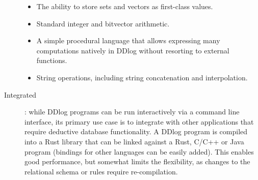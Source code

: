 \begin{description}
\begin{itemize}
    \item The ability to store sets and vectors as first-class values.
      
    \item Standard integer and bitvector arithmetic.

    \item A simple procedural language that allows expressing many
      computations natively in DDlog without resorting to external
      functions.

    \item String operations, including string concatenation and
      interpolation.
  \end{itemize}
  
  \item[Integrated]: while DDlog programs can be run interactively via
    a command line interface, its primary use case is to integrate
    with other applications that require deductive database
    functionality. A DDlog program is compiled into a Rust library
    that can be linked against a Rust, C/C++ or Java program (bindings
    for other languages can be easily added). This enables good
    performance, but somewhat limits the flexibility, as changes to
    the relational schema or rules require re-compilation.
\end{description}
